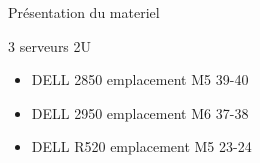 Présentation du materiel


3 serveurs 2U
\begin{itemize}
\item   DELL 2850   emplacement M5 39-40 
\item   DELL 2950   emplacement M6 37-38
\item   DELL R520   emplacement M5 23-24
\end{itemize}


